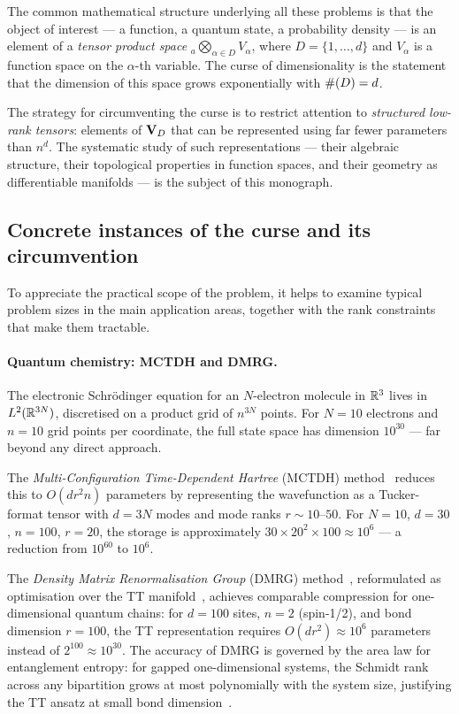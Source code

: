 The common mathematical structure underlying all these problems is that
the object of interest — a function, a quantum state, a probability
density — is an element of a \emph{tensor product space}
${}_a\bigotimes_{\alpha \in D} V_\alpha$, where $D = \{1,\ldots,d\}$
and $V_\alpha$ is a function space on the $\alpha$-th variable.
The curse of dimensionality is the statement that the dimension of this
space grows exponentially with $\#(D) = d$.

The strategy for circumventing the curse is to restrict attention to
\emph{structured low-rank tensors}: elements of $\mathbf{V}_D$ that can be
represented using far fewer parameters than $n^d$. The systematic study
of such representations — their algebraic structure, their topological
properties in function spaces, and their geometry as differentiable
manifolds — is the subject of this monograph.

\subsection*{Concrete instances of the curse and its circumvention}

To appreciate the practical scope of the problem, it helps to examine
typical problem sizes in the main application areas, together with
the rank constraints that make them tractable.

\paragraph{Quantum chemistry: MCTDH and DMRG.}
The electronic Schrödinger equation for an $N$-electron molecule in
$\mathbb{R}^3$ lives in $L^2(\mathbb{R}^{3N})$, discretised on a product grid of
$n^{3N}$ points. For $N = 10$ electrons and $n = 10$ grid points per
coordinate, the full state space has dimension $10^{30}$ — far beyond
any direct approach.

The \emph{Multi-Configuration Time-Dependent Hartree} (MCTDH)
method~\cite{BeckJackleWorthMeyer2000} reduces this to $O(d r^2 n)$
parameters by representing the wavefunction as a Tucker-format tensor
with $d = 3N$ modes and mode ranks $r \sim 10$--$50$. For $N = 10$,
$d = 30$, $n = 100$, $r = 20$, the storage is approximately
$30 \times 20^2 \times 100 \approx 10^6$ — a reduction from $10^{60}$
to $10^6$.

The \emph{Density Matrix Renormalisation Group} (DMRG)
method~\cite{White1992}, reformulated as optimisation over the TT
manifold~\cite{Oseledets2011}, achieves comparable compression for
one-dimensional quantum chains: for $d = 100$ sites, $n = 2$ (spin-1/2),
and bond dimension $r = 100$, the TT representation requires
$O(d r^2) \approx 10^6$ parameters instead of $2^{100} \approx 10^{30}$.
The accuracy of DMRG is governed by the area law for entanglement entropy:
for gapped one-dimensional systems, the Schmidt rank across any bipartition
grows at most polynomially with the system size, justifying the TT ansatz
at small bond dimension~\cite{Vidal2003}.

